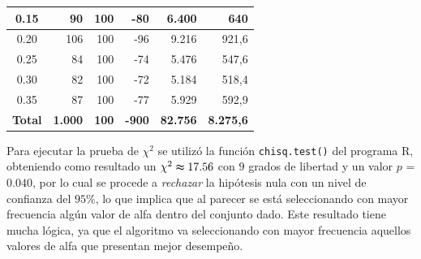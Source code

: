 \documentclass{article}
\begin{document}
\begin{table}
\begin{tabular}{|c|r|r|r|r|r|}
0.15                                 & 90                                                                             & 100                                                                           & -80                      & 6.400                          & 640                              \\ \hline
0.20                                 & 106                                                                            & 100                                                                           & -96                      & 9.216                          & 921,6                            \\ \hline
0.25                                 & 84                                                                             & 100                                                                           & -74                      & 5.476                          & 547,6                            \\ \hline
0.30                                 & 82                                                                             & 100                                                                           & -72                      & 5.184                          & 518,4                            \\ \hline
0.35                                 & 87                                                                             & 100                                                                           & -77                      & 5.929                          & 592,9                            \\ \hline
\multicolumn{1}{|l|}{\textbf{Total}} & \textbf{1.000}                                                                 & \textbf{100}                                                                  & \textbf{-900}            & \textbf{82.756}                & \textbf{8.275,6}                 \\ \hline
\end{tabular}
\label{tablacontingencia}
\end{table}

Para ejecutar la prueba de $\chi^{2}$ se utilizó la función \texttt{chisq.test()} del programa R, obteniendo como resultado un  $\chi^{2} \thickapprox 17.56$ con $9$ grados de libertad y un valor $p$ = $0.040$, por lo cual se procede a \textit{rechazar} la hipótesis nula con un nivel de confianza del $95\%$, lo que implica que al parecer se está seleccionando con mayor frecuencia algún valor de alfa dentro del conjunto dado. Este resultado tiene mucha lógica, ya que el algoritmo va seleccionando con mayor frecuencia aquellos valores de alfa que presentan mejor desempeño.
\end{document}

